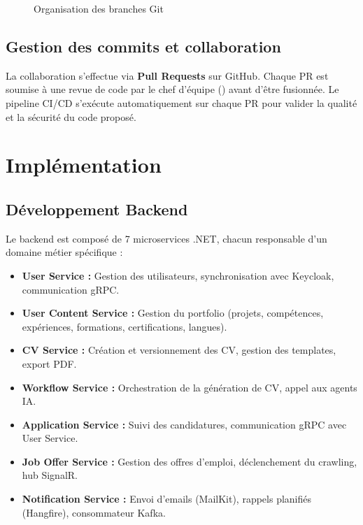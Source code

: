 \begin{figure}[H]
\centering
\caption{Organisation des branches Git}
\label{fig:git-branches}
\end{figure}

\subsection{Gestion des commits et collaboration}
\label{subsec:realisation:git-commits}

La collaboration s'effectue via \textbf{Pull Requests} sur GitHub. Chaque PR est soumise à une revue de code par le chef d'équipe (\membreUn) avant d'être fusionnée. Le pipeline CI/CD s'exécute automatiquement sur chaque PR pour valider la qualité et la sécurité du code proposé.

\section{Implémentation}
\label{sec:realisation:implementation}

\subsection{Développement Backend}
\label{subsec:realisation:backend}

Le backend est composé de 7 microservices .NET, chacun responsable d'un domaine métier spécifique :

\begin{itemize}
    \item \textbf{User Service :} Gestion des utilisateurs, synchronisation avec Keycloak, communication gRPC.
    \item \textbf{User Content Service :} Gestion du portfolio (projets, compétences, expériences, formations, certifications, langues).
    \item \textbf{CV Service :} Création et versionnement des CV, gestion des templates, export PDF.
    \item \textbf{Workflow Service :} Orchestration de la génération de CV, appel aux agents IA.
    \item \textbf{Application Service :} Suivi des candidatures, communication gRPC avec User Service.
    \item \textbf{Job Offer Service :} Gestion des offres d'emploi, déclenchement du crawling, hub SignalR.
    \item \textbf{Notification Service :} Envoi d'emails (MailKit), rappels planifiés (Hangfire), consommateur Kafka.
\end{itemize}

